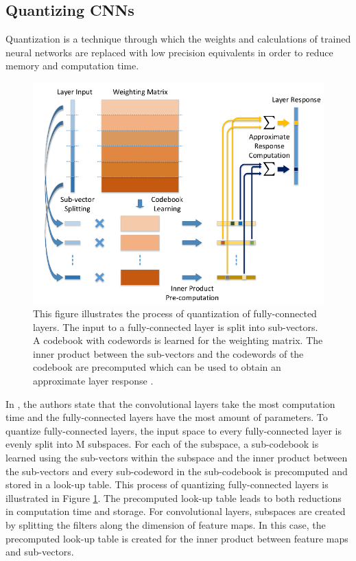 \subsection{Quantizing CNNs}

Quantization is a technique through which the weights and calculations of trained neural networks are replaced with low precision equivalents in order to reduce memory and computation time.

	\begin{figure}[h]
		\centering
		\includegraphics[width=.6\linewidth]{images/quantization}
		\caption{This figure illustrates the process of quantization of fully-connected layers. The input to a fully-connected layer is split into sub-vectors. A codebook with codewords is learned for the weighting matrix. The inner product between the sub-vectors and the codewords of the codebook are precomputed which can be used to obtain an approximate layer response \cite{DBLP:journals/corr/WuLWHC15}.}
		\label{Fig:quantiz}
	\end{figure}

In \cite{DBLP:journals/corr/WuLWHC15}, the authors state that the convolutional layers take the most computation time and the fully-connected layers have the most amount of parameters. To quantize fully-connected layers, the input space to every fully-connected layer is evenly split into M subspaces. For each of the subspace, a sub-codebook is learned using the sub-vectors within the subspace and the inner product between the sub-vectors and every sub-codeword in the sub-codebook is precomputed and stored in a look-up table. This process of quantizing fully-connected layers is illustrated in Figure \ref{Fig:quantiz}. The precomputed look-up table leads to both reductions in computation time and storage. For convolutional layers, subspaces are created by splitting the filters along the dimension of feature maps. In this case, the precomputed look-up table is created for the inner product between feature maps and sub-vectors. 


